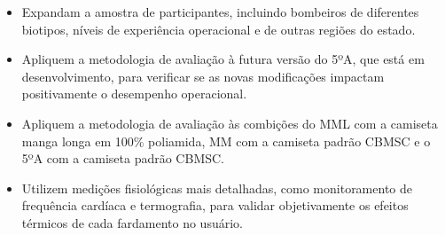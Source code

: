         \begin{itemize}
            \item Expandam a amostra de participantes, incluindo bombeiros de diferentes biotipos, 
            níveis de experiência operacional e de outras regiões do estado.
            \item Apliquem a metodologia de avaliação à futura versão do 5ºA, que está em desenvolvimento, 
            para verificar se as novas modificações impactam positivamente o desempenho operacional.
            \item Apliquem a metodologia de avaliação às combições do \acrshort{MML} com a camiseta manga 
            longa em 100\% poliamida, \acrshort{MM} com a camiseta padrão \acrshort{CBMSC} e o 5ºA com 
            a camiseta padrão \acrshort{CBMSC}.
            \item Utilizem medições fisiológicas mais detalhadas, como monitoramento de frequência 
            cardíaca e termografia, para validar objetivamente os efeitos térmicos de cada fardamento no usuário.
        \end{itemize}